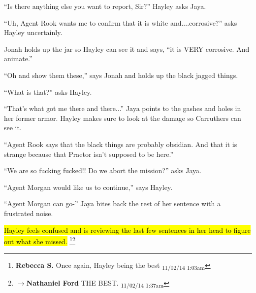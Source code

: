 ``Is there anything else you want to report, Sir?'' Hayley asks Jaya.


``Uh, Agent Rook wants me to confirm that it is white and....corrosive?'' asks Hayley uncertainly.

Jonah holds up the jar so Hayley can see it and says, ``it is VERY corrosive.  And animate.''


``Oh and show them these,'' says Jonah and holds up the black jagged things.

``What is that?'' asks Hayley.

``That's what got me there and there...'' Jaya points to the gashes and holes in her former armor.  Hayley makes sure to look at the damage so Carruthers can see it.


   {\color[RGB]{255,153,0} } 


``Agent Rook says that the black things are probably obsidian. And that it is strange because that Praetor isn't supposed to be here.''

   {\color[RGB]{255,153,0} } 

``We are so fucking fucked!!  Do we abort the mission?'' asks Jaya.


``Agent Morgan would like us to continue,'' says Hayley.

``Agent Morgan can go-'' Jaya bites back the rest of her sentence with a frustrated noise.


\hl{  Hayley feels confused and is reviewing the last few sentences in her head to figure out what she missed.} \footnote{\textbf{Rebecca S. }Once again, Hayley being the best \textsubscript{11/02/14 1:03am}}\footnote{$\rightarrow$\textbf{Nathaniel Ford }THE BEST. \textsubscript{11/02/14 1:37am}}

